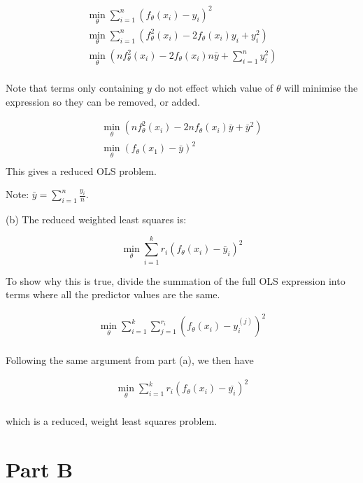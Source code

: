 \documentclass{article}
\begin{document}
    \[
    \begin{aligned}
        \min_\theta \sum_{i=1}^n(f_\theta(x_i)-y_i)^2\\
        \min_\theta \sum_{i=1}^n(f^2_\theta(x_i)-2f_\theta(x_i)y_i+y_i^2)\\ 
        \min_\theta (nf^2_\theta(x_i)-2f_\theta(x_i)n\bar{y}+\sum_{i=1}^ny_i^2)\\ 
    \end{aligned}
    \]

    Note that terms only containing $y$ do not effect which value of $\theta$ will minimise 
    the expression so they can be removed, or added.

    \[
        \begin{aligned}
            \min_\theta (nf^2_\theta(x_i)-2nf_\theta(x_i)\bar{y}+\bar{y}^2)\\ 
            \min_\theta (f_\theta(x_1)-\bar{y})^2\\
        \end{aligned}
        \]
    This gives a reduced OLS problem.
    
    Note: $\bar{y}=\sum_{i=1}^n \frac{y_i}{n}$.

    (b) The reduced weighted least squares is:

    \[\min_\theta \sum_{i=1}^k {r_i} \left( f_\theta(x_i)-\bar{y}_i\right)^2\]
    

    To show why this is true, divide the summation of the full OLS expression 
    into terms where all the predictor values are the same.

    \[
    \begin{aligned}
        \min_\theta \sum_{i=1}^k \sum_{j=1}^{r_i}(f_\theta(x_i)-y_i^{(j)})^2\\
    \end{aligned}
    \]

    Following the same argument from part (a), we then have

    \[
        \begin{aligned}
            \min_\theta \sum_{i=1}^k r_i(f_\theta(x_i)-\bar{y_i})^2\\
        \end{aligned}
        \]

        which is a reduced, weight least squares problem.

    \section{Part B}
\end{document}

